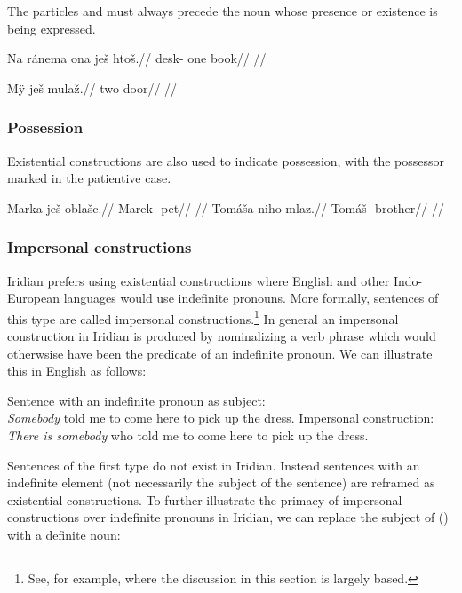 The particles  and  must always precede the noun whose presence or existence is being expressed.

\pex
\begingl
\gla Na ránema ona ješ htoš.//
\glb \Loc{} desk- one \Exst{} book//
\glft {}//
\endgl
\xe

\pex
\begingl
\gla M\"y ješ mulaž.//
\glb two \Exst{} door//
\glft {}//
\endgl
\xe



\subsubsection{Possession}
Existential constructions are also used to indicate possession, with the possessor marked in the patientive case.

\begin{multicols}{2}
\pex
  \begingl
    \gla Marka ješ oblašc.//
    \glb Marek-\Pat{} \Exst{} pet//
    \glft {}//
  \endgl
\xe
\pex
  \begingl
    \gla Tomáša niho mlaz.//
    \glb Tomáš-\Pat{} \N{}\Exst{} brother//
    \glft {}//
  \endgl
\xe
\end{multicols}

\subsubsection{Impersonal constructions}

Iridian prefers using existential constructions where English and other Indo-European languages would use indefinite pronouns. More formally, sentences of this type are called impersonal constructions.\footnote{See, for example, \textcite{lawtagalog} where the discussion in this section is largely based.} In general an impersonal construction in Iridian is produced by nominalizing a verb phrase which would otherwsise have been the predicate of an indefinite pronoun. We can illustrate this in English as follows:

\pex
\a  {}Sentence with an indefinite pronoun as subject:\\
    \emph{Somebody} told me to come here to pick up the dress.
\a  Impersonal construction:\\
    \emph{There is somebody} who told me to come here to pick up the dress.
\xe

Sentences of the first type do not exist in Iridian. Instead sentences with an indefinite element (not necessarily the subject of the sentence) are reframed as existential constructions. To further illustrate the primacy of impersonal constructions over indefinite pronouns in Iridian, we can replace the subject of () with a definite noun:

